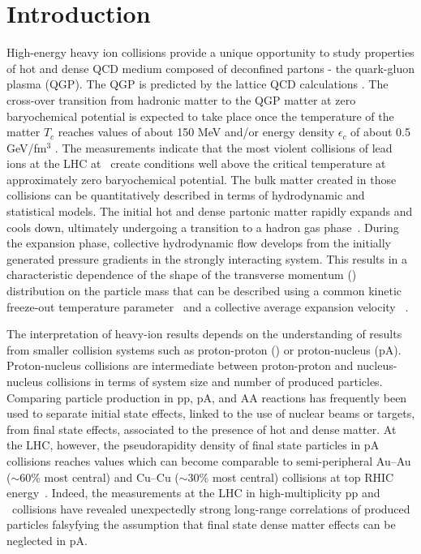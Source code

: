 
\section{Introduction}

High-energy heavy ion collisions provide a unique opportunity to study
properties of hot and dense QCD medium composed of deconfined partons -
the quark-gluon plasma (QGP). The QGP is predicted by the lattice QCD
calculations \cite{Satz:2000bn,Bass:1998vz,Shuryak:1984nq,Cleymans:1985wb}. The cross-over transition from
hadronic matter to the QGP matter at zero
baryochemical potential is expected to take place once the
temperature of the matter $T_{c}$ reaches values of about 150 MeV and/or
energy density $\epsilon_{c}$ of about 0.5 GeV/fm$^3$ \cite{Borsanyi:2010cj,Bhattacharya:2014ara}. 
The measurements indicate that the most violent collisions of lead ions at the LHC at
\ create conditions well above the critical temperature at approximately zero baryochemical potential.
The bulk matter created in those collisions can be
quantitatively described in terms of hydrodynamic and statistical
models. The initial hot and dense partonic matter rapidly expands and
cools down, ultimately undergoing a transition to a hadron gas
phase~\cite{Muller:2006ee}. During the expansion phase, collective hydrodynamic flow develops from
the initially generated pressure gradients in the strongly interacting
system. This results in a characteristic dependence of the shape of
the transverse momentum (\pt) distribution on the particle mass that
can be described using a common kinetic freeze-out temperature parameter \Tfo\
and a collective average expansion velocity
\avbT~\cite{Schnedermann:1993ws}.

The interpretation of heavy-ion results depends on the understanding of results from smaller collision
systems such as proton-proton (\pp) or proton-nucleus (pA). Proton-nucleus collisions are intermediate between
proton-proton and nucleus-nucleus collisions in terms of
system size and number of produced particles. Comparing particle
production in pp, pA, and AA reactions has frequently been used to
separate initial state effects, linked to the use of nuclear
beams or targets, from final state effects, associated to the presence of hot and
dense matter. At the LHC, however, the pseudorapidity density of final state
particles in pA collisions reaches values which can become
comparable to semi-peripheral Au--Au ($\sim$60\% most central) and Cu--Cu ($\sim$30\% most central) collisions at top RHIC energy~\cite{Alver:2010ck}.
Indeed, the measurements at the LHC in high-multiplicity pp and \pPb\ collisions have revealed unexpectedly strong long-range correlations of produced particles \cite{Khachatryan:2010gv,CMS:2012qk,Abelev:2012ola,Aad:2012gla,Aad:2013fja,Chatrchyan:2013nka} falsyfying the assumption that final state dense matter effects can be neglected in pA.

